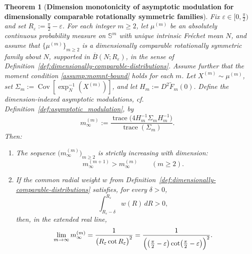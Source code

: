 \documentclass[10pt,a4paper]{amsart}
\newtheorem{theorem}{Theorem}
\begin{document}
\begin{theorem}[\textbf{Dimension monotonicity of asymptotic modulation for dimensionally comparable rotationally symmetric families}]
\label{thm:dim_monotone_modulation_rot}
Fix \(\varepsilon\in[0,\frac{\pi}{2})\) and set \(R_\varepsilon:=\frac{\pi}{2}-\varepsilon\).  For each integer \(m\ge2\), let \(\mu^{(m)}\) be an absolutely continuous probability measure on \(\mathbb S^m\) with unique intrinsic Fr\'echet mean \(N\), and assume that \(\{\mu^{(m)}\}_{m\ge2}\) is a dimensionally comparable rotationally symmetric family about \(N\), supported in \(\overline B(N;R_\varepsilon)\), in the sense of Definition~\ref{def:dimensionally-comparable-distributions}.  Assume further that the moment condition \ref{assump:momnt-bound} holds for each \(m\).  Let \(X^{(m)}\sim\mu^{(m)}\), set \(\Sigma_m:=\operatorname{Cov}[\exp_N^{-1}(X^{(m)})]\), and let \(H_m:=D^2\widetilde F_m(0)\).  Define the dimension-indexed asymptotic modulations, cf. Definition~\ref{def:asymptotic_modulation}, by
\[
m_\infty^{(m)}
:=
\frac{\operatorname{trace}\!\bigl(4H_m^{-1}\Sigma_m H_m^{-1}\bigr)}{\operatorname{trace}(\Sigma_m)}.
\]
Then:
\begin{enumerate}
\item The sequence \(\bigl(m_\infty^{(m)}\bigr)_{m\ge2}\) is strictly increasing with dimension:
\[
m_\infty^{(m+1)} > m_\infty^{(m)}
\qquad (m\ge2).
\]

\item If the common radial weight \(w\) from Definition~\ref{def:dimensionally-comparable-distributions} satisfies, for every \(\delta>0\),
\[
\int_{R_\varepsilon-\delta}^{R_\varepsilon} w(R)\,dR > 0,
\]
then, in the extended real line,
\[
\lim_{m\to\infty} m_\infty^{(m)}
=
\frac{1}{\bigl(R_\varepsilon \cot R_\varepsilon\bigr)^2}
=
\frac{1}{\Bigl(\left(\frac{\pi}{2}-\varepsilon\right)\cot\!\left(\frac{\pi}{2}-\varepsilon\right)\Bigr)^2}.
\]
\end{enumerate}
\end{theorem}
\end{document}
